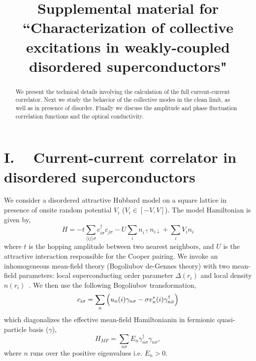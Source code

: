 \documentclass[Colective.tex]{revtex4-1}
\begin{document}
\setcounter{affil}{0}
\renewcommand{\thefigure}{S\arabic{figure}}
\setcounter{figure}{0}
\renewcommand{\theequation}{S\arabic{equation}}
\setcounter{equation}{0}
\renewcommand\thesection{S\arabic{section}}
\setcounter{section}{0}

\title{Supplemental material for ``Characterization of collective excitations in weakly-coupled disordered superconductors"}
\label{SI}


\begin{abstract}
\noindent We present the technical details involving the calculation of the full current-current correlator. Next we study the behavior of the collective modes in the clean limit, as well as in presence of disorder. Finally we discuss the amplitude and phase fluctuation correlation functions and the optical conductivity.
\end{abstract}
\maketitle
\onecolumngrid
\section{I.\,\,\,\,\,\,     Current-current correlator in disordered superconductors}
We consider a disordered attractive Hubbard model on a square lattice in presence of onsite random potential $V_i$ ($V_i\in [-V,V]$). The model Hamiltonian is given by,
\begin{equation}
H = -t\sum_{\langle ij\rangle\sigma} c^\dagger_{i\sigma} c_{j\sigma} - U\sum_i n_{i\uparrow}n_{i\downarrow} + \sum_i V_i n_i
\end{equation} 
where $t$ is the hopping amplitude between two nearest neighbors, and $U$ is the attractive interaction responsible for the Cooper pairing. We invoke an inhomogeneous mean-field theory (Bogoliubov de-Gennes theory) with two mean-field parameters: local superconducting order parameter $\Delta(r_i)$ and local density $n(r_i)$~\cite{Ghosal2001, ghosal1998}.  We then use the following Bogoliubov transformation,
\begin{equation}
c_{i\sigma} = \sum_n \left(u_n(i)\gamma_{n\sigma} - \sigma v^*_n(i)\gamma^\dagger_{n\bar\sigma}\right)
\end{equation}
which diagonalizes the effective mean-field Hamiltonianin in fermionic quasi-particle basis ($\gamma$),
\begin{equation}
H_{MF} = \sum_{n\sigma} E_n \gamma^\dagger_{n\sigma}\gamma_{n\sigma},
\end{equation}
where $n$ runs over the positive eigenvalues i.e. $E_n>0$.
\end{document}
